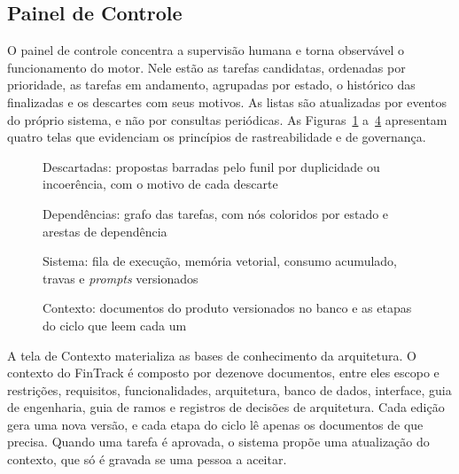 \subsection{Painel de Controle}\label{sec:5.2.3}

O painel de controle concentra a supervisão humana e torna observável o funcionamento do motor. Nele estão as tarefas candidatas, ordenadas por prioridade, as tarefas em andamento, agrupadas por estado, o histórico das finalizadas e os descartes com seus motivos. As listas são atualizadas por eventos do próprio sistema, e não por consultas periódicas. As Figuras~\ref{fig:7} a~\ref{fig:10} apresentam quatro telas que evidenciam os princípios de rastreabilidade e de governança.

\begin{figure}[htb]
\centering
\caption{Descartadas: propostas barradas pelo funil por duplicidade ou incoerência, com o motivo de cada descarte}
\label{fig:7}
\end{figure}

\begin{figure}[htb]
\centering
\caption{Dependências: grafo das tarefas, com nós coloridos por estado e arestas de dependência}
\label{fig:8}
\end{figure}

\begin{figure}[htb]
\centering
\caption{Sistema: fila de execução, memória vetorial, consumo acumulado, travas e \textit{prompts} versionados}
\label{fig:9}
\end{figure}

\begin{figure}[htb]
\centering
\caption{Contexto: documentos do produto versionados no banco e as etapas do ciclo que leem cada um}
\label{fig:10}
\end{figure}

A tela de Contexto materializa as bases de conhecimento da arquitetura. O contexto do FinTrack é composto por dezenove documentos, entre eles escopo e restrições, requisitos, funcionalidades, arquitetura, banco de dados, interface, guia de engenharia, guia de ramos e registros de decisões de arquitetura. Cada edição gera uma nova versão, e cada etapa do ciclo lê apenas os documentos de que precisa. Quando uma tarefa é aprovada, o sistema propõe uma atualização do contexto, que só é gravada se uma pessoa a aceitar.

